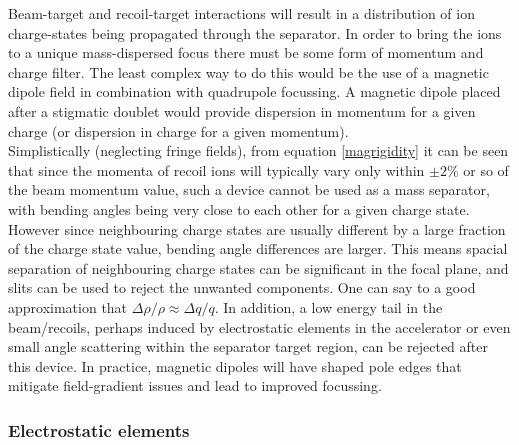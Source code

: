Beam-target and recoil-target interactions will result in a distribution of ion charge-states being propagated through the separator. In order to bring the ions to a unique mass-dispersed focus there must be some form of momentum and charge filter. The least complex way to do this would be the use of a magnetic dipole field in combination with quadrupole focussing. A magnetic dipole placed after a stigmatic doublet would provide dispersion in momentum for a given charge (or dispersion in charge for a given momentum). \\
Simplistically (neglecting fringe fields), from equation \ref{magrigidity} it can be seen that since the momenta of recoil ions will typically vary only within $\pm2\%$ or so of the beam momentum value, such a device cannot be used as a mass separator, with bending angles being very close to each other for a given charge state. However since neighbouring charge states are usually different by a large fraction of the charge state value, bending angle differences are larger. This means spacial separation of neighbouring charge states can be significant in the focal plane, and slits can be used to reject the unwanted components. One can say to a good approximation that $\Delta \rho / \rho \approx \Delta q / q$. In addition, a low energy tail in the beam/recoils, perhaps induced by electrostatic elements in the accelerator or even small angle scattering within the separator target region, can be rejected after this device. In practice, magnetic dipoles will have shaped pole edges that mitigate field-gradient issues and lead to improved focussing.

\subsubsection{Electrostatic elements}


